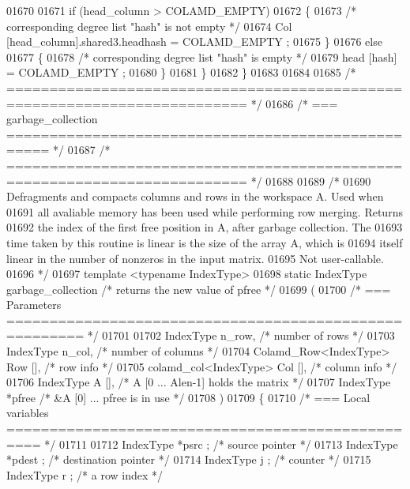 \begin{DoxyCode}
{{{{{{{{{{{{{{{{{{{{{{{{{{{{01670 
01671     \textcolor{keywordflow}{if} (head\_column > COLAMD\_EMPTY)
01672     \{
01673       \textcolor{comment}{/* corresponding degree list "hash" is not empty */}
01674       Col [head\_column].shared3.headhash = COLAMD\_EMPTY ;
01675     \}
01676     \textcolor{keywordflow}{else}
01677     \{
01678       \textcolor{comment}{/* corresponding degree list "hash" is empty */}
01679       head [hash] = COLAMD\_EMPTY ;
01680     \}
01681   \}
01682 \}
01683 
01684 
01685 \textcolor{comment}{/* ========================================================================== */}
01686 \textcolor{comment}{/* === garbage\_collection =================================================== */}
01687 \textcolor{comment}{/* ========================================================================== */}
01688 
01689 \textcolor{comment}{/*}
01690 \textcolor{comment}{  Defragments and compacts columns and rows in the workspace A.  Used when}
01691 \textcolor{comment}{  all avaliable memory has been used while performing row merging.  Returns}
01692 \textcolor{comment}{  the index of the first free position in A, after garbage collection.  The}
01693 \textcolor{comment}{  time taken by this routine is linear is the size of the array A, which is}
01694 \textcolor{comment}{  itself linear in the number of nonzeros in the input matrix.}
01695 \textcolor{comment}{  Not user-callable.}
01696 \textcolor{comment}{*/}
01697 \textcolor{keyword}{template} <\textcolor{keyword}{typename} IndexType>
01698 \textcolor{keyword}{static} IndexType garbage\_collection  \textcolor{comment}{/* returns the new value of pfree */}
01699   (
01700     \textcolor{comment}{/* === Parameters ======================================================= */}
01701     
01702     IndexType n\_row,      \textcolor{comment}{/* number of rows */}
01703     IndexType n\_col,      \textcolor{comment}{/* number of columns */}
01704     Colamd\_Row<IndexType> Row [],    \textcolor{comment}{/* row info */}
01705     colamd\_col<IndexType> Col [],    \textcolor{comment}{/* column info */}
01706     IndexType A [],     \textcolor{comment}{/* A [0 ... Alen-1] holds the matrix */}
01707     IndexType *pfree      \textcolor{comment}{/* &A [0] ... pfree is in use */}
01708     )
01709 \{
01710   \textcolor{comment}{/* === Local variables ================================================== */}
01711 
01712   IndexType *psrc ;     \textcolor{comment}{/* source pointer */}
01713   IndexType *pdest ;    \textcolor{comment}{/* destination pointer */}
01714   IndexType j ;     \textcolor{comment}{/* counter */}
01715   IndexType r ;     \textcolor{comment}{/* a row index */}
}}}}}}}}}}}}}}}}}}}}}}}}}}}}
\end{DoxyCode}
